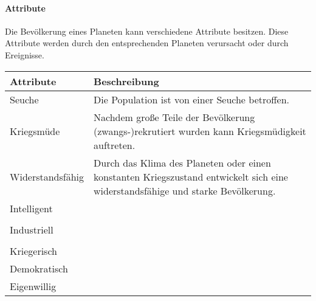 \documentclass[11pt, a4paper]{article}
\begin{document}
\paragraph{Attribute}
Die Bevölkerung eines Planeten kann verschiedene Attribute besitzen. Diese Attribute werden durch den 
entsprechenden Planeten verursacht oder durch Ereignisse.
%
\begin{center}
    \begin{tabularx}{\linewidth}{|l X|}
        \hline
        Attribute        & Beschreibung                                                                                                                    \\
        \hline
        Seuche           & Die Population ist von einer Seuche betroffen.                                                                                  \\
        Kriegsmüde       & Nachdem große Teile der Bevölkerung (zwangs-)rekrutiert wurden kann Kriegsmüdigkeit auftreten.                                  \\
        
        Widerstandsfähig & Durch das Klima des Planeten oder einen konstanten Kriegszustand entwickelt sich eine widerstandsfähige und starke Bevölkerung. \\
        
        Intelligent      &                                                                                                                                 \\                                                                                                                      \\
        Industriell      &                                                                                                                                 \\                                                                                                                    \\
        Kriegerisch      &                                                                                                                                 \\
        Demokratisch     &                                                                                                                                 \\
        Eigenwillig      &                                                                                                                                 \\
        
        \hline
    \end{tabularx}
\end{center}
%
\end{document}
